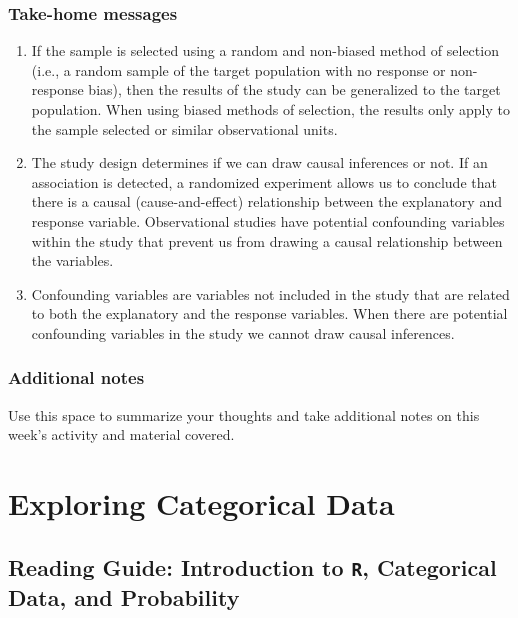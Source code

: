 \documentclass[
]{report}
\begin{document}
\vspace{0.8in}

\hypertarget{take-home-messages-1}{%
\subsection{Take-home messages}\label{take-home-messages-1}}

\begin{enumerate}
\def\labelenumi{\arabic{enumi}.}
\item
  If the sample is selected using a random and non-biased method of selection (i.e., a random sample of the target population with no response or non-response bias), then the results of the study can be generalized to the target population. When using biased methods of selection, the results only apply to the sample selected or similar observational units.
\item
  The study design determines if we can draw causal inferences or not. If an association is detected, a randomized experiment allows us to conclude that there is a causal (cause-and-effect) relationship between the explanatory and response variable. Observational studies have potential confounding variables within the study that prevent us from drawing a causal relationship between the variables.
\item
  Confounding variables are variables not included in the study that are related to both the explanatory and the response variables. When there are potential confounding variables in the study we cannot draw causal inferences.
\end{enumerate}

\hypertarget{additional-notes-1}{%
\subsection{Additional notes}\label{additional-notes-1}}

Use this space to summarize your thoughts and take additional notes on this week's activity and material covered.

\hypertarget{exploring-categorical-data}{%
\chapter{Exploring Categorical Data}\label{exploring-categorical-data}}

\hypertarget{reading-guide-introduction-to-r-categorical-data-and-probability}{%
\section{\texorpdfstring{Reading Guide: Introduction to \texttt{R}, Categorical Data, and Probability}{Reading Guide: Introduction to R, Categorical Data, and Probability}}\label{reading-guide-introduction-to-r-categorical-data-and-probability}}
\end{document}
